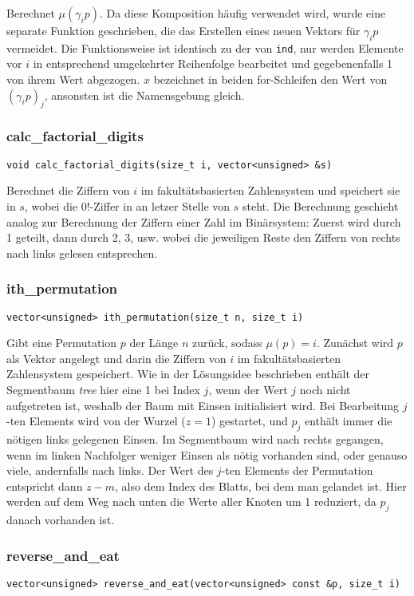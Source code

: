 \documentclass[a4paper, 10pt, ngerman]{article}
\begin{document}
\noindent Berechnet $\mu(\gamma_i p)$. Da diese Komposition häufig verwendet wird, wurde eine separate Funktion geschrieben, die das Erstellen eines neuen Vektors für $\gamma_i p$ vermeidet. Die Funktionsweise ist identisch zu der von \verb|ind|, nur werden Elemente vor $i$ in entsprechend umgekehrter Reihenfolge bearbeitet und gegebenenfalls 1 von ihrem Wert abgezogen. $x$ bezeichnet in beiden for-Schleifen den Wert von $(\gamma_i p)_j$, ansonsten ist die Namensgebung gleich.

\subsubsection{calc\_factorial\_digits}
\verb|void calc_factorial_digits(size_t i, vector<unsigned> &s)|
\medskip

\noindent Berechnet die Ziffern von $i$ im fakultätsbasierten Zahlensystem und speichert sie in $s$, wobei die $0!$-Ziffer in an letzer Stelle von $s$ steht. Die Berechnung geschieht analog zur Berechnung der Ziffern einer Zahl im Binärsystem: Zuerst wird durch 1 geteilt, dann durch 2, 3, usw. wobei die jeweiligen Reste den Ziffern von rechts nach links gelesen entsprechen.

\subsubsection{ith\_permutation}
\verb|vector<unsigned> ith_permutation(size_t n, size_t i)|
\medskip

\noindent Gibt eine Permutation $p$ der Länge $n$ zurück, sodass $\mu(p) = i$. Zunächst wird $p$ als Vektor angelegt und darin die Ziffern von $i$ im fakultätsbasierten Zahlensystem gespeichert. Wie in der Lösungsidee beschrieben enthält der Segmentbaum \emph{tree} hier eine 1 bei Index $j$, wenn der Wert $j$ noch nicht aufgetreten ist, weshalb der Baum mit Einsen initialisiert wird. Bei Bearbeitung $j$-ten Elements wird von der Wurzel ($z = 1$) gestartet, und $p_j$ enthält immer die nötigen links gelegenen Einsen. Im Segmentbaum wird nach rechts gegangen, wenn im linken Nachfolger weniger Einsen als nötig vorhanden sind, oder genauso viele, andernfalls nach links. Der Wert des $j$-ten Elements der Permutation entspricht dann $z - m$, also dem Index des Blatts, bei dem man gelandet ist. Hier werden auf dem Weg nach unten die Werte aller Knoten um 1 reduziert, da $p_j$ danach vorhanden ist.

\subsubsection{reverse\_and\_eat}
\verb|vector<unsigned> reverse_and_eat(vector<unsigned> const &p, size_t i)|
\medskip
\end{document}
